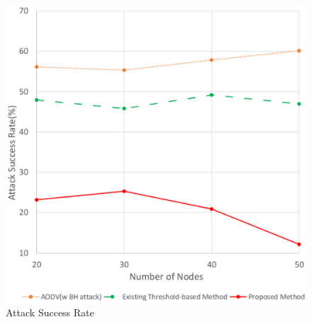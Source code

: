\documentclass[conference]{IEEEtran}
\begin{document}
\begin{figure}[!htb]
\centering
\includegraphics [scale=0.45]{ASR}
\caption{Attack Success Rate}
\label{fig:attackSuccessRate}
\end{figure}
\end{document}
